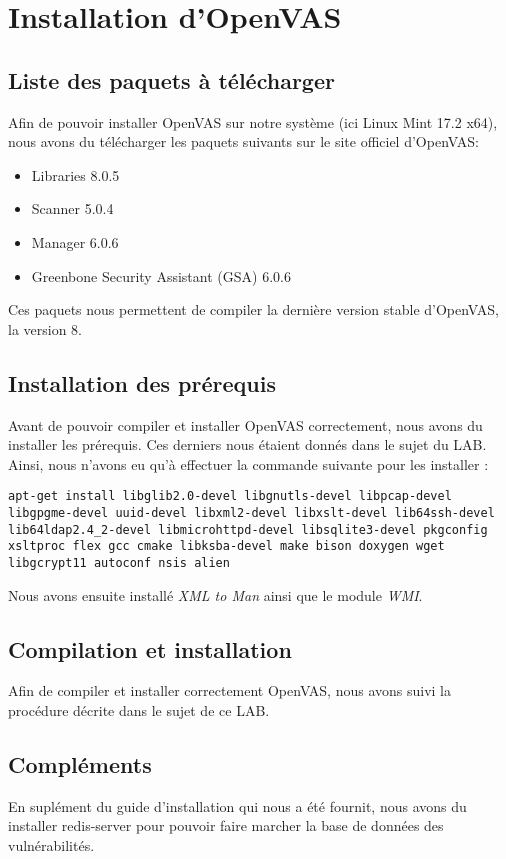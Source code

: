 \section{Installation d'OpenVAS}
\subsection{Liste des paquets à télécharger}
Afin de pouvoir installer OpenVAS sur notre système (ici Linux Mint 17.2 x64), nous avons du télécharger les paquets suivants sur le site officiel d'OpenVAS\cite{OVDL}:
\begin{itemize}
 \item Libraries 8.0.5
 \item Scanner 5.0.4
 \item Manager 6.0.6
 \item Greenbone Security Assistant (GSA) 6.0.6
\end{itemize}
Ces paquets nous permettent de compiler la dernière version stable d'OpenVAS, la version 8.
\subsection{Installation des prérequis}
Avant de pouvoir compiler et installer OpenVAS correctement, nous avons du installer les prérequis. Ces derniers nous étaient donnés dans le sujet du LAB. Ainsi, nous n'avons eu qu'à effectuer la commande suivante pour les installer :
\begin{lstlisting}[style=custombash]
apt-get install libglib2.0-devel libgnutls-devel libpcap-devel libgpgme-devel uuid-devel libxml2-devel libxslt-devel lib64ssh-devel lib64ldap2.4_2-devel libmicrohttpd-devel libsqlite3-devel pkgconfig xsltproc flex gcc cmake libksba-devel make bison doxygen wget libgcrypt11 autoconf nsis alien
\end{lstlisting}
Nous avons ensuite installé \textit{XML to Man} ainsi que le module \textit{WMI}.
\subsection{Compilation et installation}
Afin de compiler et installer correctement OpenVAS, nous avons suivi la procédure décrite dans le sujet de ce LAB.
\subsection{Compléments}
En suplément du guide d'installation qui nous a été fournit, nous avons du installer redis-server pour pouvoir faire marcher la base de données des vulnérabilités.